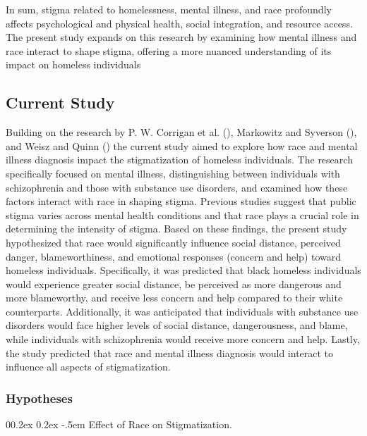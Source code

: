 \documentclass[
  man,
  floatsintext,
  longtable,
  nolmodern,
  notxfonts,
  notimes,
  colorlinks=true,linkcolor=blue,citecolor=blue,urlcolor=blue]{apa7}
\makeatletter
\renewcommand{\paragraph}{\@startsection{paragraph}{4}{\parindent}%
	{0\baselineskip \@plus 0.2ex \@minus 0.2ex}%
	{-.5em}%
	{\normalfont\normalsize\bfseries\typesectitle}}
\makeatother
\begin{document}
In sum, stigma related to homelessness, mental illness, and race
profoundly affects psychological and physical health, social
integration, and resource access. The present study expands on this
research by examining how mental illness and race interact to shape
stigma, offering a more nuanced understanding of its impact on homeless
individuals

\subsection{Current Study}\label{current-study}

Building on the research by P. W. Corrigan et al.
(), Markowitz and
Syverson (), and
Weisz and Quinn
() the
current study aimed to explore how race and mental illness diagnosis
impact the stigmatization of homeless individuals. The research
specifically focused on mental illness, distinguishing between
individuals with schizophrenia and those with substance use disorders,
and examined how these factors interact with race in shaping stigma.
Previous studies suggest that public stigma varies across mental health
conditions and that race plays a crucial role in determining the
intensity of stigma. Based on these findings, the present study
hypothesized that race would significantly influence social distance,
perceived danger, blameworthiness, and emotional responses (concern and
help) toward homeless individuals. Specifically, it was predicted that
black homeless individuals would experience greater social distance, be
perceived as more dangerous and more blameworthy, and receive less
concern and help compared to their white counterparts. Additionally, it
was anticipated that individuals with substance use disorders would face
higher levels of social distance, dangerousness, and blame, while
individuals with schizophrenia would receive more concern and help.
Lastly, the study predicted that race and mental illness diagnosis would
interact to influence all aspects of stigmatization.

\subsubsection{Hypotheses}\label{hypotheses}

\paragraph{Effect of Race on
Stigmatization.}\label{effect-of-race-on-stigmatization}
\end{document}
